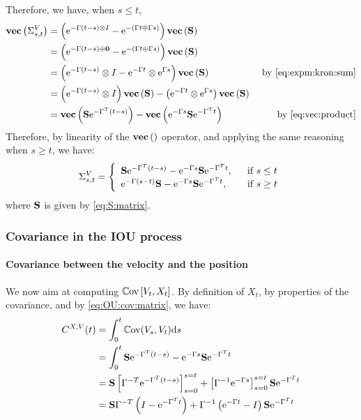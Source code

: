 Therefore, we have, when $s\leq t$,
\begin{align*}
\textbf{vec}\left(\Sigma_{s,t}^V \right) &= \left( \text{e}^{- \Gamma(t-s) \otimes I } - \text{e}^{-(\Gamma t \oplus \Gamma s)} \right) \textbf{vec}\left(\mathbf{S} \right)& \\
&=\left( \text{e}^{- \Gamma(t-s) \oplus \mathbf{0}} - \text{e}^{-(\Gamma t \oplus \Gamma s)} \right) \textbf{vec}\left(\mathbf{S} \right)&\\
&=\left( \text{e}^{- \Gamma(t-s)} \otimes I - \text{e}^{-\Gamma t} \otimes \text{e}^{\Gamma s} \right) \textbf{vec}\left(\mathbf{S} \right) & \text { by \eqref{eq:expm:kron:sum}}\\
&=\left( \text{e}^{- \Gamma(t-s)} \otimes I\right)\textbf{vec}\left(\mathbf{S} \right) - \left(\text{e}^{-\Gamma t} \otimes \text{e}^{\Gamma s} \right)\textbf{vec}\left(\mathbf{S} \right)  & \\
&=\textbf{vec}\left(\mathbf{S}\text{e}^{-\Gamma^T (t - s)} \right) -\textbf{vec}\left(\text{e}^{-\Gamma s}\mathbf{S} \text{e}^{-\Gamma^T t} \right) & \text{ by \eqref{eq:vec:product}}\\
\end{align*}
Therefore, by linearity of the $\textbf{vec}\left(\hbox{} \right)$ operator, and applying the same reasoning when $s\geq t$, we have:
\begin{equation}
\Sigma_{s,t}^V =  \left\lbrace \begin{array}{lr}
 \mathbf{S}\text{e}^{-\Gamma^T (t - s)} -\text{e}^{-\Gamma s}\mathbf{S} \text{e}^{-\Gamma^T t},& ~\text{ if } s \leq t \\
 \text{e}^{-\Gamma (s - t)}\mathbf{S} -\text{e}^{-\Gamma s}\mathbf{S} \text{e}^{-\Gamma^T t},&~\text{ if } s \geq t
\end{array}\right.
\label{eq:OU:cov:matrix}
\end{equation}
where $\mathbf{S}$ is given by \eqref{eq:S:matrix}.

\subsubsection{Covariance in the IOU process}

\paragraph{Covariance between the velocity and the position}

We now aim at computing $\mathbb{C}\text{ov}\left[V_t, X_t\right]$.
By definition of $X_t$, by properties of the covariance, and by \eqref{eq:OU:cov:matrix}, we have:
\begin{align*}
C^{X,V}(t) &= \int_0^t  \mathbb{C}\text{ov}(V_s, V_t) \text{d} s\\
&=\int_0^t \mathbf{S}\text{e}^{-\Gamma^T (t - s)} -\text{e}^{-\Gamma s}\mathbf{S} \text{e}^{-\Gamma^T t}\\
&= \mathbf{S}\left[\Gamma^{-T}\text{e}^{-\Gamma^T (t - s)} \right]_{s = 0}^{s = t} + \left[\Gamma^{-1}\text{e}^{-\Gamma s} \right]_{s = 0}^{s = t} \mathbf{S}  \text{e}^{-\Gamma^T t}\\
&= \mathbf{S} \Gamma^{-T}\left(I - \text{e}^{-\Gamma^T t}\right) + \Gamma^{-1}\left(\text{e}^{-\Gamma t} - I\right)\mathbf{S}  \text{e}^{-\Gamma^T t}
\end{align*}

